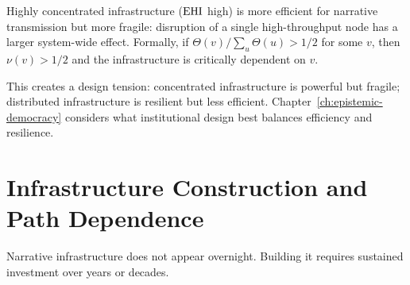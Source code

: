 \begin{proposition}
\label{prop:fragility-concentration}
Highly concentrated infrastructure ($\mathrm{EHI}$ high) is more efficient for narrative transmission but more fragile: disruption of a single high-throughput node has a larger system-wide effect.
Formally, if $\Theta(v) / \sum_u \Theta(u) > 1/2$ for some $v$, then $\nu(v) > 1/2$ and the infrastructure is critically dependent on $v$.
\end{proposition}

This creates a design tension: concentrated infrastructure is powerful but fragile; distributed infrastructure is resilient but less efficient.
Chapter~\ref{ch:epistemic-democracy} considers what institutional design best balances efficiency and resilience.


\section{Infrastructure Construction and Path Dependence}
\label{sec:ch7-construction}

Narrative infrastructure does not appear overnight.
Building it requires sustained investment over years or decades.

